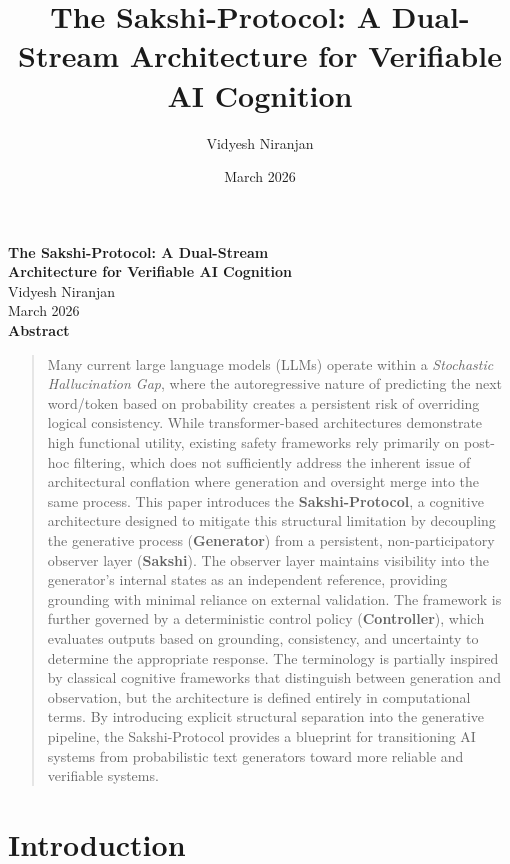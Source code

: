 \documentclass[12pt,a4paper]{article}
\title{\textbf{The Sakshi-Protocol: A Dual-Stream Architecture for Verifiable AI Cognition}}
\author{Vidyesh Niranjan}
\date{March 2026}
\begin{document}
\begin{center}
    \vspace*{-1.5cm} %
    {\LARGE \textbf{The Sakshi-Protocol: A Dual-Stream}} \\[0.4ex]
    {\LARGE \textbf{Architecture for Verifiable AI Cognition}} \\[2ex]
    
    {\large Vidyesh Niranjan} \\[1ex]
    {\small March 2026} \\[3ex]
    
    \large \textbf{Abstract}
\end{center}

\begin{quote}
\noindent
Many current large language models (LLMs) operate within a \textit{Stochastic Hallucination Gap}, where the autoregressive nature of predicting the next word/token based on probability creates a persistent risk of overriding logical consistency. While transformer-based architectures demonstrate high functional utility, existing safety frameworks rely primarily on post-hoc filtering, which does not sufficiently address the inherent issue of architectural conflation where generation and oversight merge into the same process. This paper introduces the \textbf{Sakshi-Protocol}, a cognitive architecture designed to mitigate this structural limitation by decoupling the generative process (\textbf{Generator}) from a persistent, non-participatory observer layer (\textbf{Sakshi}). The observer layer maintains visibility into the generator’s internal states as an independent reference, providing grounding with minimal reliance on external validation. The framework is further governed by a deterministic control policy (\textbf{Controller}), which evaluates outputs based on grounding, consistency, and uncertainty to determine the appropriate response. The terminology is partially inspired by classical cognitive frameworks that distinguish between generation and observation, but the architecture is defined entirely in computational terms. By introducing explicit structural separation into the generative pipeline, the Sakshi-Protocol provides a blueprint for transitioning AI systems from probabilistic text generators toward more reliable and verifiable systems.
\end{quote}

\section{Introduction}
\end{document}
